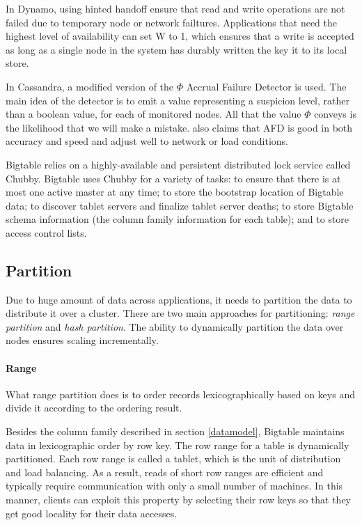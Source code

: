 \documentclass[12pt,letter]{article}
\begin{document}
In Dynamo, using hinted handoff ensure that read and write operations are not failed due to temporary node or network failtures. Applications that need the highest level of availability can set W to 1, which ensures that a write is accepted as long as a single node in the system has durably written the key it to its local store. 

In Cassandra, a modified version of the $\Phi$ Accrual Failure Detector is used. The main idea of the detector is to emit a value representing a suspicion level, rather than a boolean value, for each of monitored nodes. All that the value $\Phi$ conveys is the likelihood that we will make a mistake. \citep{LakshamAvinash2010} also claims that AFD is good in both accuracy and speed and adjust well to network or load conditions.

Bigtable relies on a highly-available and persistent distributed lock service called Chubby. Bigtable uses Chubby for a variety of tasks: to ensure that there is at most one active master at any time; to store the bootstrap location of Bigtable data; to discover tablet servers and finalize tablet server deaths; to store Bigtable schema information (the column family information for each table); and to store access control lists.

\subsection{Partition}
Due to huge amount of data across applications, it needs to partition the data to distribute it over a cluster. There are two main approaches for partitioning: \textit{range partition} and \textit{hash partition}. The ability to dynamically partition the data over nodes ensures scaling incrementally. 

\paragraph*{Range}
What range partition does is to order records lexicographically based on keys and divide it according to the ordering result.

Besides the column family described in section \ref{datamodel}, Bigtable maintains data in lexicographic order by row key. The row range for a table is dynamically partitioned. Each row range is called a tablet, which is the unit of distribution and load balancing. As a result, reads of short row ranges are efficient and typically require communication with only a small number of machines. In this manner, clients can exploit this property by selecting their row keys so that they get good locality for their data accesses.
\end{document}
